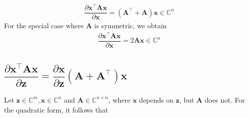 \documentclass{article}
\newcommand{\trans}{\top}
\begin{document}
\begin{align}
    \label{eq:quadratic-solution}
    \boxed{\dfrac{\partial \mathbf{x}^\trans \mathbf{A} \mathbf{x}}{\partial \mathbf{x}} = \left(\mathbf{A}^\trans + \mathbf{A}\right) \mathbf{x} \in \mathbb{C}^{n}}
\end{align}
For the special case where \(\mathbf{A}\) is symmetric, we obtain
\begin{align}
    \boxed{\dfrac{\partial \mathbf{x}^\trans \mathbf{A} \mathbf{x}}{\partial \mathbf{x}} = 2\mathbf{A} \mathbf{x} \in \mathbb{C}^{n}}
\end{align}

\subsection{\(\dfrac{\partial \mathbf{x}^\trans \mathbf{A} \mathbf{x}}{\partial \mathbf{z}} = \dfrac{\partial \mathbf{x}}{\partial \mathbf{z}}\left( \mathbf{A} + \mathbf{A}^\trans \right) \mathbf{x}\)}
Let \(\mathbf{z} \in \mathbb{C}^{m}, \mathbf{x} \in \mathbb{C}^{n}\) and \(\mathbf{A}\in \mathbb{C}^{n\times n}\), where \(\mathbf{x}\) depends on \(\mathbf{z}\), but \(\mathbf{A}\) does not. For the quadratic form, it follows that
\end{document}
